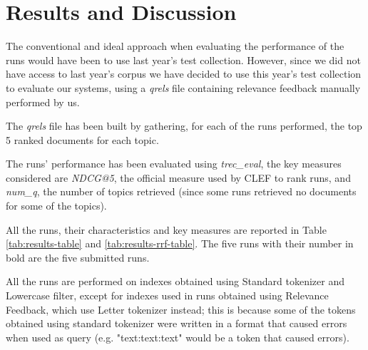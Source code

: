 \section{Results and Discussion}
\label{sec:results}

The conventional and ideal approach when evaluating the performance of the runs would have been to use last year's test collection. However, since we did not have access to last year's corpus we have decided to use this year's test collection to evaluate our systems, using a \textit{qrels} file containing relevance feedback manually performed by us.

The \textit{qrels} file has been built by gathering, for each of the runs performed, the top 5 ranked documents for each topic.

The runs' performance has been evaluated using \textit{trec\_eval}, the key measures considered are \textit{NDCG@5}, the official measure used by CLEF to rank runs, and \textit{num\_q}, the number of topics retrieved (since some runs retrieved no documents for some of the topics).

All the runs, their characteristics and key measures are reported in Table \ref{tab:results-table} and \ref{tab:results-rrf-table}. The five runs with their number in bold are the five submitted runs.

All the runs are performed on indexes obtained using Standard tokenizer and Lowercase filter, except for indexes used in runs obtained using Relevance Feedback, which use Letter tokenizer instead; this is because some of the tokens obtained using standard tokenizer were written in a format that caused errors when used as query (e.g. "text:text:text" would be a token that caused errors).

